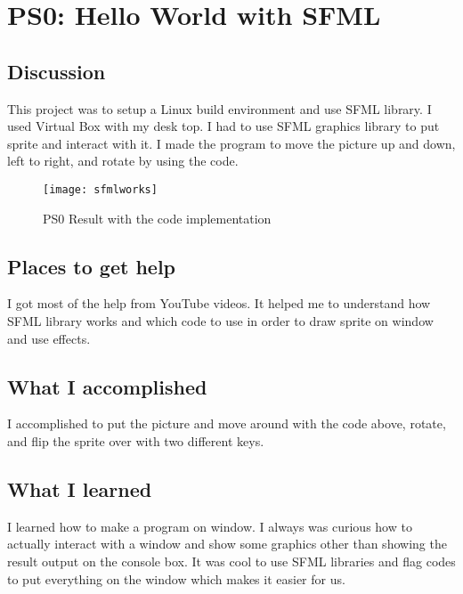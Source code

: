 \section{PS0: Hello World with SFML}\label{sec:ps0}

\subsection{Discussion}\label{sec:ps0:disc}

This project was to setup a Linux build environment and use SFML library. I used Virtual Box with my desk top. I had to use SFML graphics library to put sprite and interact with it. I made the program to move the picture up and down, left to right, and rotate by using the code.




\begin{figure}[tbh]
	\centering
	\texttt{[image: sfmlworks]}
	\caption{PS0 Result with the code implementation}
	\label{fig:PS0 Sprite}
\end{figure}

\subsection{Places to get help}
I got most of the help from YouTube videos. It helped me to understand how SFML library works and which code to use in order to draw sprite on window and use effects.

\subsection{What I accomplished}\label{sec:ps0:accomplish}

I accomplished to put the picture and move around with the code above, rotate, and flip the sprite over with two different keys.


\subsection{What I learned}\label{sec:ps0:learned}

I learned how to make a program on window. I always was curious how to actually interact with a window and show some graphics other than showing the result output on the console box. It was cool to use SFML libraries and flag codes to put everything on the window which makes it easier for us.

